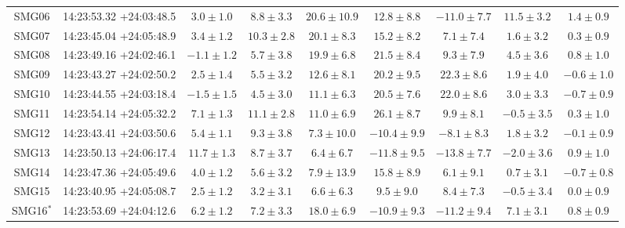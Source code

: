 \documentclass[twocolumn,traditabstract]{aa}
\begin{document}
\begin{table}[h]
\begin{center}
\begin{tabular}{ccccccccc}
SMG06 & 14:23:53.32 +24:03:48.5 & $     3.0 \pm      1.0$ & $     8.8 \pm      3.3$ & $    20.6 \pm     10.9$ & $    12.8 \pm      8.8$ & $   -11.0 \pm      7.7$ & $    11.5 \pm      3.2$ & $     1.4 \pm      0.9$ \\
SMG07 & 14:23:45.04 +24:05:48.9 & $     3.4 \pm      1.2$ & $    10.3 \pm      2.8$ & $    20.1 \pm      8.3$ & $    15.2 \pm      8.2$ & $     7.1 \pm      7.4$ & $     1.6 \pm      3.2$ & $     0.3 \pm      0.9$ \\
SMG08 & 14:23:49.16 +24:02:46.1 & $    -1.1 \pm      1.2$ & $     5.7 \pm      3.8$ & $    19.9 \pm      6.8$ & $    21.5 \pm      8.4$ & $     9.3 \pm      7.9$ & $     4.5 \pm      3.6$ & $     0.8 \pm      1.0$ \\
SMG09 & 14:23:43.27 +24:02:50.2 & $     2.5 \pm      1.4$ & $     5.5 \pm      3.2$ & $    12.6 \pm      8.1$ & $    20.2 \pm      9.5$ & $    22.3 \pm      8.6$ & $     1.9 \pm      4.0$ & $    -0.6 \pm      1.0$ \\
SMG10 & 14:23:44.55 +24:03:18.4 & $    -1.5 \pm      1.5$ & $     4.5 \pm      3.0$ & $    11.1 \pm      6.3$ & $    20.5 \pm      7.6$ & $    22.0 \pm      8.6$ & $     3.0 \pm      3.3$ & $    -0.7 \pm      0.9$ \\
SMG11 & 14:23:54.14 +24:05:32.2 & $     7.1 \pm      1.3$ & $    11.1 \pm      2.8$ & $    11.0 \pm      6.9$ & $    26.1 \pm      8.7$ & $     9.9 \pm      8.1$ & $    -0.5 \pm      3.5$ & $     0.3 \pm      1.0$ \\
SMG12 & 14:23:43.41 +24:03:50.6 & $     5.4 \pm      1.1$ & $     9.3 \pm      3.8$ & $     7.3 \pm     10.0$ & $   -10.4 \pm      9.9$ & $    -8.1 \pm      8.3$ & $     1.8 \pm      3.2$ & $    -0.1 \pm      0.9$ \\
SMG13 & 14:23:50.13 +24:06:17.4 & $    11.7 \pm      1.3$ & $     8.7 \pm      3.7$ & $     6.4 \pm      6.7$ & $   -11.8 \pm      9.5$ & $   -13.8 \pm      7.7$ & $    -2.0 \pm      3.6$ & $     0.9 \pm      1.0$ \\
SMG14 & 14:23:47.36 +24:05:49.6 & $     4.0 \pm      1.2$ & $     5.6 \pm      3.2$ & $     7.9 \pm     13.9$ & $    15.8 \pm      8.9$ & $     6.1 \pm      9.1$ & $     0.7 \pm      3.1$ & $    -0.7 \pm      0.8$ \\
SMG15 & 14:23:40.95 +24:05:08.7 & $     2.5 \pm      1.2$ & $     3.2 \pm      3.1$ & $     6.6 \pm      6.3$ & $     9.5 \pm      9.0$ & $     8.4 \pm      7.3$ & $    -0.5 \pm      3.4$ & $     0.0 \pm      0.9$ \\
SMG16$^*$ & 14:23:53.69 +24:04:12.6 & $     6.2 \pm      1.2$ & $     7.2 \pm      3.3$ & $    18.0 \pm      6.9$ & $   -10.9 \pm      9.3$ & $   -11.2 \pm      9.4$ & $     7.1 \pm      3.1$ & $     0.8 \pm      0.9$ \\

\end{tabular}
\end{center}
\end{table}
\end{document}

